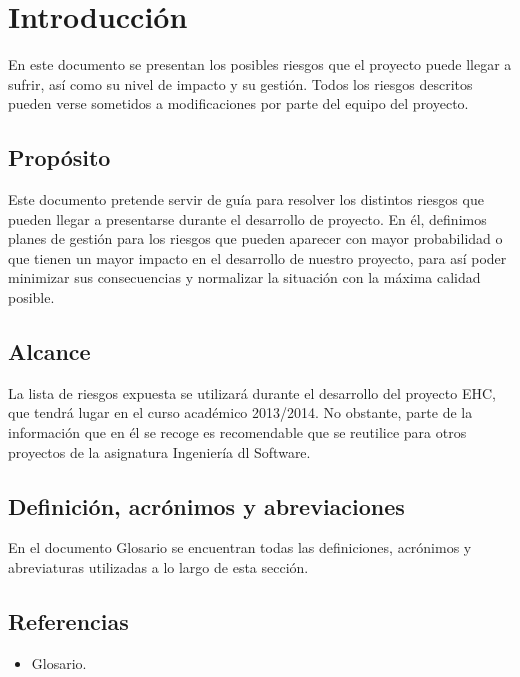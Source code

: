 \chapter{Introducción}
En este documento se presentan los posibles riesgos que el proyecto puede llegar a sufrir, así como su nivel de impacto y su gestión. Todos los riesgos descritos pueden verse sometidos a modificaciones por parte del equipo del proyecto.
\section{Propósito}
Este documento pretende servir de guía para resolver los distintos riesgos que pueden llegar a presentarse durante el desarrollo de proyecto. En él, definimos planes de gestión para los riesgos que pueden aparecer con mayor probabilidad o que tienen un mayor impacto en el desarrollo de nuestro proyecto, para así poder minimizar sus consecuencias y normalizar la situación con la máxima calidad posible.
\section{Alcance}
La lista de riesgos expuesta se utilizará durante el desarrollo del proyecto EHC, que tendrá lugar en el curso académico 2013/2014. No obstante, parte de la información que en él se recoge es recomendable que se reutilice para otros proyectos de la asignatura Ingeniería dl Software.
\section{Definición, acrónimos y abreviaciones}
En el documento Glosario se encuentran todas las definiciones, acrónimos y abreviaturas utilizadas a lo largo de esta sección.
\section{Referencias}
	\begin{itemize}
		\item Glosario.
	\end{itemize}
